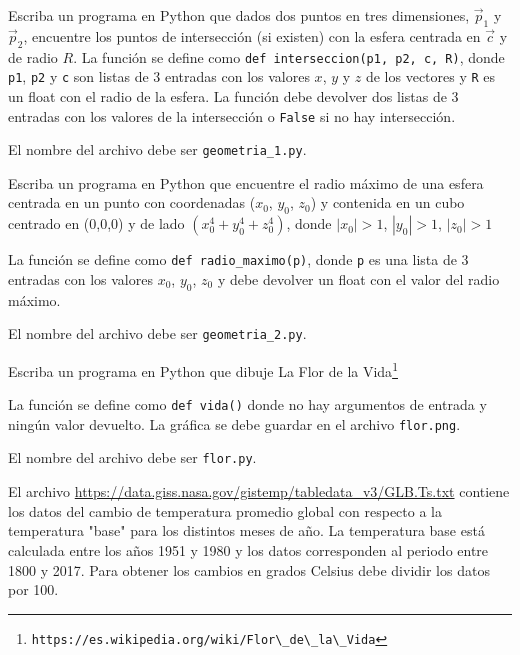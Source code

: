 \documentclass[11pt,letterpaper]{exam}
\begin{document}
\vspace{0.3cm}
\begin{questions}


Escriba un programa en Python que dados dos puntos en tres
dimensiones, $\vec{p}_1$ y $\vec{p}_2$, encuentre los puntos de
intersecci\'on (si existen) con la esfera centrada en $\vec{c}$ y de
radio $R$.  
La funci\'on se define como  \verb"def interseccion(p1, p2, c, R)",
donde \verb"p1", \verb"p2" y \verb"c" son listas de 3 entradas con los
valores $x$, $y$ y $z$ de los vectores y \verb"R" es un float con el
radio de la esfera.  
La funci\'on debe devolver dos listas de 3 entradas con los valores de
la intersecci\'on o \verb"False" si no hay intersecci\'on.  

El nombre del archivo debe ser \verb"geometria_1.py".


Escriba un programa en Python que encuentre el radio máximo de una
esfera centrada en un punto con coordenadas
($x_0$, $y_0$, $z_0$) y contenida en un cubo centrado en (0,0,0) y de
lado $(x_0^4+y_0^4+z_0^4)$, donde $|x_0|>1$, $|y_0|>1$, $|z_0|>1$

La funci\'on se define como  \verb"def radio_maximo(p)", donde
\verb"p" es una lista de 3 entradas con los valores $x_0$, $y_0$,
$z_0$ y debe devolver un float con el valor del radio m\'aximo.

El nombre del archivo debe ser \verb"geometria_2.py".


Escriba un programa en Python que dibuje La Flor de la Vida\footnote{\verb"https://es.wikipedia.org/wiki/Flor\_de\_la\_Vida"}

La funci\'on se define como  \verb"def vida()" donde no hay argumentos
de entrada y ning\'un valor devuelto. La gr\'afica se debe guardar en el archivo \verb"flor.png".

El nombre del archivo debe ser \verb"flor.py".


El archivo \url{https://data.giss.nasa.gov/gistemp/tabledata_v3/GLB.Ts.txt}
 contiene los datos del cambio de temperatura promedio global con
respecto a la temperatura "base" para los distintos meses de año. La
temperatura base está calculada entre los años 1951 y 1980 y los datos
corresponden al periodo entre 1800 y 2017. Para obtener los cambios en
grados Celsius debe dividir los datos por 100.


\end{questions}
\end{document}
